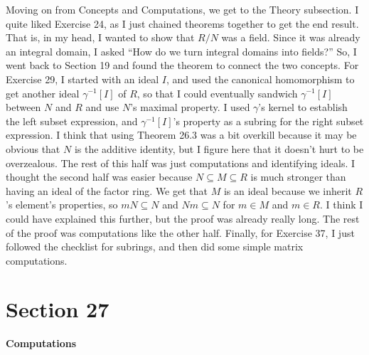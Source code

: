 \documentclass[12pt, oneside]{book}
\begin{document}
Moving on from Concepts and Computations, we get to the Theory subsection. I quite liked Exercise 24, as I just chained theorems together to get the end result. That is, in my head, I wanted to show that \(R/N\) was a field. Since it was already an integral domain, I asked ``How do we turn integral domains into fields?'' So, I went back to Section 19 and found the theorem to connect the two concepts. For Exercise 29, I started with an ideal \(I\), and used the canonical homomorphism to get another ideal \(\gamma^{-1}[I]\) of \(R\), so that I could eventually sandwich \(\gamma^{-1}[I]\) between \(N\) and \(R\) and use \(N\)'s maximal property. I used \(\gamma\)'s kernel to establish the left subset expression, and \(\gamma^{-1}[I]\)'s property as a subring for the right subset expression. I think that using Theorem 26.3 was a bit overkill because it may be obvious that \(N\) is the additive identity, but I figure here that it doesn't hurt to be overzealous. The rest of this half was just computations and identifying ideals. I thought the second half was easier because \(N \subseteq M \subseteq R\) is much stronger than having an ideal of the factor ring. We get that \(M\) is an ideal because we inherit \(R\)'s element's properties, so \(mN \subseteq N\) and \(Nm \subseteq N\) for \(m \in M\) and \(m \in R\). I think I could have explained this further, but the proof was already really long. The rest of the proof was computations like the other half. Finally, for Exercise 37, I just followed the checklist for subrings, and then did some simple matrix computations.


\newpage

\section*{Section 27}

\textbf{Computations}
\end{document}
